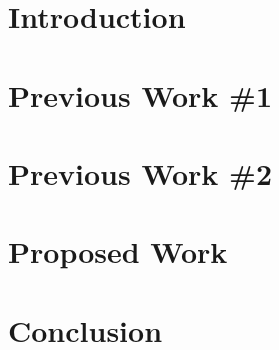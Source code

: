 \documentclass[12pt]{article}
\title{}
\author{
	\authorName\\
	\authorDepartment\\
	\authorAddress \\ %
	\authorEmail \\
}
\date{\today}
\begin{document}
	


\newpage
\tableofcontents

\newpage

\section{Introduction}


\section{Previous Work \#1}
\label{chap:previous_1}


\section{Previous Work \#2}
\label{chap:previous_2}


\section{Proposed Work}
\label{chap:proposed}


\section{Conclusion}


\newpage
\small


\end{document}
